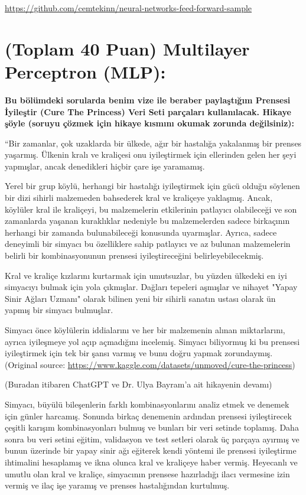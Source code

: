 \documentclass[11pt]{article}
\begin{document}
\url{https://github.com/cemtekinn/neural-networks-feed-forward-sample}

\section{(Toplam 40 Puan) Multilayer Perceptron (MLP):} 
\textbf{Bu bölümdeki sorularda benim vize ile beraber paylaştığım Prensesi İyileştir (Cure The Princess) Veri Seti parçaları kullanılacak. Hikaye şöyle (soruyu çözmek için hikaye kısmını okumak zorunda değilsiniz):} 

``Bir zamanlar, çok uzaklarda bir ülkede, ağır bir hastalığa yakalanmış bir prenses yaşarmış. Ülkenin kralı ve kraliçesi onu iyileştirmek için ellerinden gelen her şeyi yapmışlar, ancak denedikleri hiçbir çare işe yaramamış.

Yerel bir grup köylü, herhangi bir hastalığı iyileştirmek için gücü olduğu söylenen bir dizi sihirli malzemeden bahsederek kral ve kraliçeye yaklaşmış. Ancak, köylüler kral ile kraliçeyi, bu malzemelerin etkilerinin patlayıcı olabileceği ve son zamanlarda yaşanan kuraklıklar nedeniyle bu malzemelerden sadece birkaçının herhangi bir zamanda bulunabileceği konusunda uyarmışlar. Ayrıca, sadece deneyimli bir simyacı bu özelliklere sahip patlayıcı ve az bulunan malzemelerin belirli bir kombinasyonunun prensesi iyileştireceğini belirleyebilecekmiş.

Kral ve kraliçe kızlarını kurtarmak için umutsuzlar, bu yüzden ülkedeki en iyi simyacıyı bulmak için yola çıkmışlar. Dağları tepeleri aşmışlar ve nihayet "Yapay Sinir Ağları Uzmanı" olarak bilinen yeni bir sihirli sanatın ustası olarak ün yapmış bir simyacı bulmuşlar.

Simyacı önce köylülerin iddialarını ve her bir malzemenin alınan miktarlarını, ayrıca iyileşmeye yol açıp açmadığını incelemiş. Simyacı biliyormuş ki bu prensesi iyileştirmek için tek bir şansı varmış ve bunu doğru yapmak zorundaymış. (Original source: \url{https://www.kaggle.com/datasets/unmoved/cure-the-princess})

(Buradan itibaren ChatGPT ve Dr. Ulya Bayram'a ait hikayenin devamı)

Simyacı, büyülü bileşenlerin farklı kombinasyonlarını analiz etmek ve denemek için günler harcamış. Sonunda birkaç denemenin ardından prensesi iyileştirecek çeşitli karışım kombinasyonları bulmuş ve bunları bir veri setinde toplamış. Daha sonra bu veri setini eğitim, validasyon ve test setleri olarak üç parçaya ayırmış ve bunun üzerinde bir yapay sinir ağı eğiterek kendi yöntemi ile prensesi iyileştirme ihtimalini hesaplamış ve ikna olunca kral ve kraliçeye haber vermiş. Heyecanlı ve umutlu olan kral ve kraliçe, simyacının prensese hazırladığı ilacı vermesine izin vermiş ve ilaç işe yaramış ve prenses hastalığından kurtulmuş.
\end{document}
